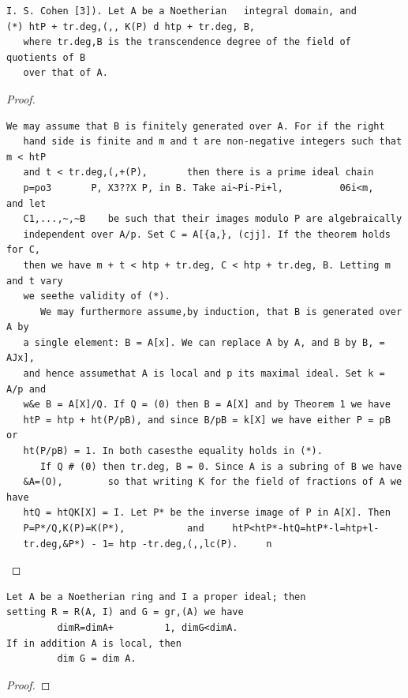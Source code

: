 \begin{theorem}\label{mcrt-auto-theorem-15-5}\uses{}
\begin{verbatim}
I. S. Cohen [3]). Let A be a Noetherian   integral domain, and
(*) htP + tr.deg,(,, K(P) d htp + tr.deg, B,
   where tr.deg,B is the transcendence degree of the field of quotients of B
   over that of A.
\end{verbatim}
\end{theorem}
\begin{proof}
\begin{verbatim}
We may assume that B is finitely generated over A. For if the right
   hand side is finite and m and t are non-negative integers such that m < htP
   and t < tr.deg,(,+(P),       then there is a prime ideal chain
   p=po3       P, X3??X P, in B. Take ai~Pi-Pi+l,          06i<m,      and let
   C1,...,~,~B    be such that their images modulo P are algebraically
   independent over A/p. Set C = A[{a,}, (cjj]. If the theorem holds for C,
   then we have m + t < htp + tr.deg, C < htp + tr.deg, B. Letting m and t vary
   we seethe validity of (*).
      We may furthermore assume,by induction, that B is generated over A by
   a single element: B = A[x]. We can replace A by A, and B by B, = AJx],
   and hence assumethat A is local and p its maximal ideal. Set k = A/p and
   w&e B = A[X]/Q. If Q = (0) then B = A[X] and by Theorem 1 we have
   htP = htp + ht(P/pB), and since B/pB = k[X] we have either P = pB or
   ht(P/pB) = 1. In both casesthe equality holds in (*).
      If Q # (0) then tr.deg, B = 0. Since A is a subring of B we have
   &A=(O),        so that writing K for the field of fractions of A we have
   htQ = htQK[X] = I. Let P* be the inverse image of P in A[X]. Then
   P=P*/Q,K(P)=K(P*),           and     htP<htP*-htQ=htP*-l=htp+l-
   tr.deg,&P*) - 1= htp -tr.deg,(,,lc(P).     n
\end{verbatim}
\end{proof}


\begin{theorem}\label{mcrt-auto-theorem-15-7}\uses{}
\begin{verbatim}
Let A be a Noetherian ring and I a proper ideal; then
setting R = R(A, I) and G = gr,(A) we have
         dimR=dimA+         1, dimG<dimA.
If in addition A is local, then
         dim G = dim A.
\end{verbatim}
\end{theorem}
\begin{proof}
\notready
\end{proof}


